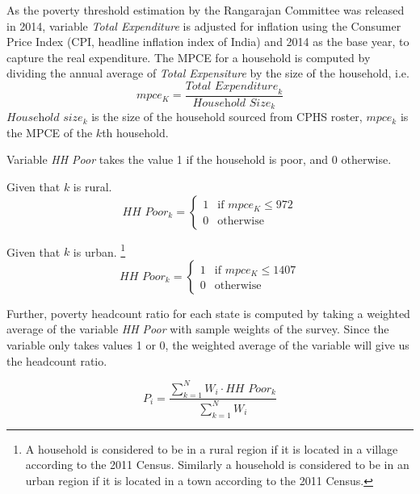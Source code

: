 \documentclass [12pt]{article}
\begin{document}
\text As the poverty threshold estimation by the Rangarajan Committee was released in 2014,  variable \textit{Total Expenditure} is adjusted for inflation using the Consumer Price Index (CPI, headline inflation index of India) and 2014 as the base year, to capture the real expenditure. The MPCE for a household is computed by dividing the annual average of \textit{Total Expensiture} by the size of the household, i.e.
\[
mpce_{K} = \frac{\textit{Total Expenditure}_{k}}{\textit{Household Size}_{k}}
\]
\noindent \small $\textit{Household size}_{k}$ is the size of the household sourced from CPHS roster, \(mpce_{k}\) is the MPCE of the \(k\)th household. 
\vspace{0.2cm}

\noindent Variable \textit{HH Poor} takes the value 1 if the household is poor, and 0 otherwise.
\begin{multicols}{2}
Given that $k$ is rural.
    \begin{equation} \nonumber
    \textit{HH Poor}_{k} =
    \begin{cases}
        1 & \text{if } mpce_{K} \leq 972 \\
        0 & \text{otherwise}
    \end{cases}
    \end{equation} 

    \columnbreak
Given that $k$ is urban. \footnote{A household is considered to be in a rural region if it is located in a village according to the 2011 Census. Similarly a household is considered to be in an urban region if it is located in a town according to the 2011 Census.}
    \begin{equation} \nonumber
    \textit{HH Poor}_{k} =
    \begin{cases}
        1 & \text{if } mpce_{K} \leq 1407 \\
        0 & \text{otherwise}
    \end{cases}
    \end{equation}
\end{multicols}

\noindent Further, poverty headcount ratio for each state is computed by taking a weighted average of the variable \textit{HH Poor} with sample weights of the survey. Since the variable only takes values 1 or 0, the weighted average of the variable will give us the headcount ratio. 

\begin{equation} \nonumber
    P_i = \frac{\sum_{k=1}^{N} W_i \cdot \textit{HH Poor}_{k}}{\sum_{k=1}^{N} W_i }
\end{equation} 
\end{document}
